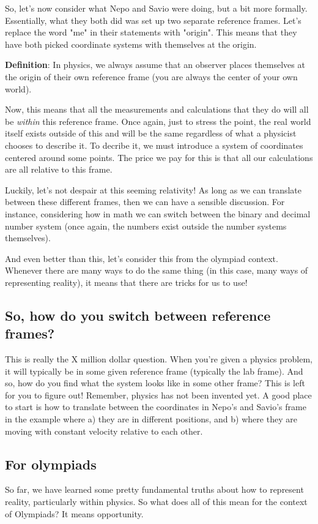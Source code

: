 \documentclass{article}
\begin{document}
So, let's now consider what Nepo and Savio were doing, but a bit more formally. Essentially, what they both did was set up two separate reference frames. Let's replace the word "me" in their statements with "origin". This means that they have both picked coordinate systems with themselves at the origin. 

\textbf{Definition}: In physics, we always assume that an observer places themselves at the origin of their own reference frame (you are always the center of your own world).

Now, this means that all the measurements and calculations that they do will all be \textit{within} this reference frame. Once again, just to stress the point, the real world itself exists outside of this and will be the same regardless of what a physicist chooses to describe it. To decribe it, we must introduce a system of coordinates centered around some points. The price we pay for this is that all our calculations are all relative to this frame. 

Luckily, let's not despair at this seeming relativity! As long as we can translate between these different frames, then we can have a sensible discussion. For instance, considering how in math we can switch between the binary and decimal number system (once again, the numbers exist outside the number systems themselves). 

And even better than this, let's consider this from the olympiad context. Whenever there are many ways to do the same thing (in this case, many ways of representing reality), it means that there are tricks for us to use!

\subsection{So, how do you switch between reference frames?}
This is really the X million dollar question. When you're given a physics problem, it will typically be in some given reference frame (typically the lab frame). And so, how do you find what the system looks like in some other frame? This is left for you to figure out! Remember, physics has not been invented yet. A good place to start is how to translate between the coordinates in Nepo's and Savio's frame in the example where a) they are in different positions, and b) where they are moving with constant velocity relative to each other.

\subsection{For olympiads}
So far, we have learned some pretty fundamental truths about how to represent reality, particularly within physics. So what does all of this mean for the context of Olympiads? It means opportunity.
\end{document}
